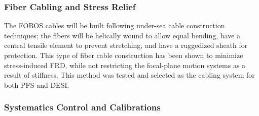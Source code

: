 \documentclass[oneside,11pt]{amsart}
\begin{document}
\subsubsection{Fiber Cabling and Stress Relief}

The FOBOS cables will be built following under-sea cable construction techniques; the fibers will be helically wound to allow equal bending, have a central tensile element to prevent stretching, and have a ruggedized sheath for protection. This type of fiber cable construction has been shown to minimize stress-induced FRD, while not restricting the focal-plane motion systems as a result of stiffness.  This method was tested and selected as the cabling system for both PFS and DESI.

\subsubsection{Systematics Control and Calibrations}
\label{sec:calib}


\end{document}
